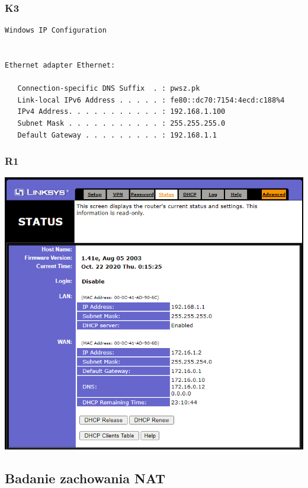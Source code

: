 \documentclass[11pt]{article}
\begin{document}
\subsubsection{K3}
\label{sec:org849465a}
\begin{verbatim}
Windows IP Configuration


Ethernet adapter Ethernet:

   Connection-specific DNS Suffix  . : pwsz.pk
   Link-local IPv6 Address . . . . . : fe80::dc70:7154:4ecd:c188%4
   IPv4 Address. . . . . . . . . . . : 192.168.1.100
   Subnet Mask . . . . . . . . . . . : 255.255.255.0
   Default Gateway . . . . . . . . . : 192.168.1.1
\end{verbatim}
\subsubsection{R1}
\label{sec:org8507a75}
\begin{center}
\includegraphics[width=.9\linewidth]{./router_interfejsy.png}
\end{center}
\subsection{Badanie zachowania NAT}
\label{sec:org11f24db}
\end{document}
